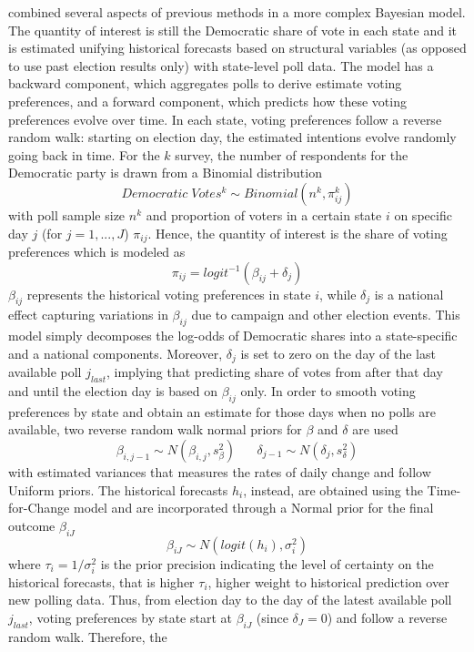 \documentclass[
  12pt]{article}
\begin{document}
\citep{lin:2013} combined several aspects of previous methods in a more
complex Bayesian model. The quantity of interest is still the Democratic
share of vote in each state and it is estimated unifying historical
forecasts based on structural variables (as opposed to use past election
results only) with state-level poll data. The model has a backward
component, which aggregates polls to derive estimate voting preferences,
and a forward component, which predicts how these voting preferences
evolve over time. In each state, voting preferences follow a reverse
random walk: starting on election day, the estimated intentions evolve
randomly going back in time. For the \(k\) survey, the number of
respondents for the Democratic party is drawn from a Binomial
distribution \[Democratic \; Votes^k \sim Binomial(n^k, \pi_{ij}^k)\]
with poll sample size \(n^k\) and proportion of voters in a certain
state \(i\) on specific day \(j\) (for \(j = 1,...,J\)) \(\pi_{ij}\).
Hence, the quantity of interest is the share of voting preferences which
is modeled as \[\pi_{ij} = logit^{-1}(\beta_{ij} + \delta_j)\]
\(\beta_{ij}\) represents the historical voting preferences in state
\(i\), while \(\delta_j\) is a national effect capturing variations in
\(\beta_{ij}\) due to campaign and other election events. This model
simply decomposes the log-odds of Democratic shares into a
state-specific and a national components. Moreover, \(\delta_j\) is set
to zero on the day of the last available poll \(j_{last}\), implying
that predicting share of votes from after that day and until the
election day is based on \(\beta_{ij}\) only. In order to smooth voting
preferences by state and obtain an estimate for those days when no polls
are available, two reverse random walk normal priors for \(\beta\) and
\(\delta\) are used
\[\beta_{i,j-1} \sim N(\beta_{i,j}, s^2_{\beta}) \;\;\;\;\;\; \delta_{j-1} \sim N(\delta_j, s^2_{\delta})\]
with estimated variances that measures the rates of daily change and
follow Uniform priors. The historical forecasts \(h_i\), instead, are
obtained using the \citet{abr:2008} Time-for-Change model and are
incorporated through a Normal prior for the final outcome \(\beta_{iJ}\)
\[\beta_{iJ} \sim N(logit(h_i), \sigma_i^2)\] where
\(\tau_i = 1 / \sigma_i^2\) is the prior precision indicating the level
of certainty on the historical forecasts, that is higher \(\tau_i\),
higher weight to historical prediction over new polling data. Thus, from
election day to the day of the latest available poll \(j_{last}\),
voting preferences by state start at \(\beta_{iJ}\) (since
\(\delta_J = 0\)) and follow a reverse random walk. Therefore, the
\end{document}

